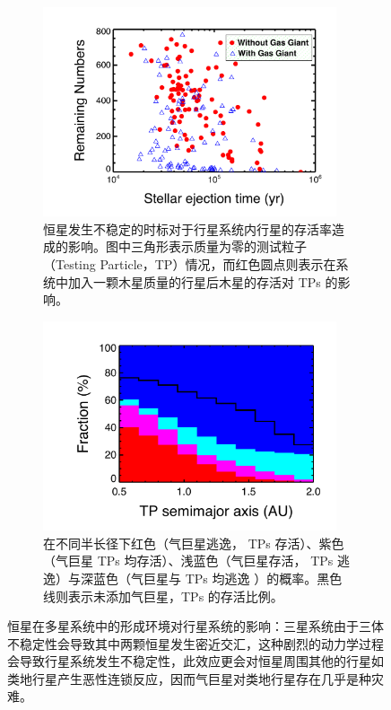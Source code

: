 \begin{figure}[t!]
\centering
\begin{subfigure}[b]{.48\textwidth}
\captionsetup{width=0.9\textwidth}
\centering
\includegraphics[width=0.95\textwidth]{figures/chapter5/fig3a_stellarenv.pdf}
\caption{恒星发生不稳定的时标对于行星系统内行星的存活率造成的影响。图中三角形表示质量为零的测试粒子（Testing Particle，TP）情况，而红色圆点则表示在系统中加入一颗木星质量的行星后木星的存活对 TPs 的影响。}
\end{subfigure}
\begin{subfigure}[b]{.48\textwidth}
\captionsetup{width=0.9\textwidth}
\centering
\includegraphics[width=0.95\textwidth]{figures/chapter5/fig3b_innerplanet.pdf}
\caption{在不同半长径下红色（气巨星逃逸， TPs 存活）、紫色（气巨星 TPs 均存活）、浅蓝色（气巨星存活， TPs 逃逸）与深蓝色（气巨星与 TPs 均逃逸 ）的概率。黑色线则表示未添加气巨星，TPs 的存活比例。}
\end{subfigure}
\caption{恒星在多星系统中的形成环境对行星系统的影响：三星系统由于三体不稳定性会导致其中两颗恒星发生密近交汇，这种剧烈的动力学过程会导致行星系统发生不稳定性，此效应更会对恒星周围其他的行星如类地行星产生恶性连锁反应，因而气巨星对类地行星存在几乎是种灾难。}
\label{fig:staraffp} 
\end{figure}


